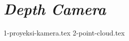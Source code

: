 \section{\emph{Depth Camera}}
\label{sec:depthcamera}

\textcolor{red}{\lipsum[1-2]}

{1-proyeksi-kamera.tex}
{2-point-cloud.tex}

